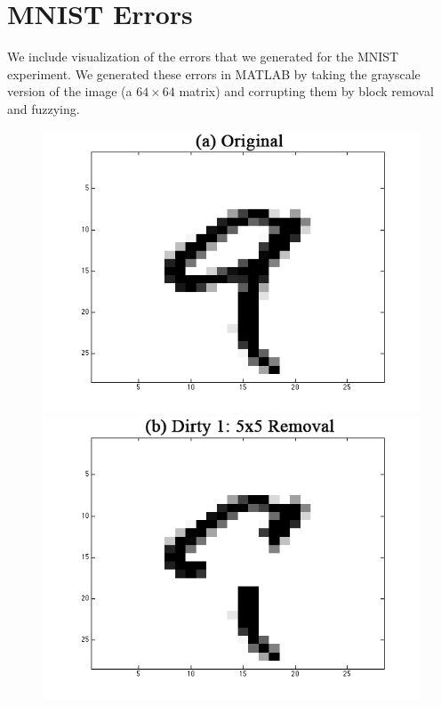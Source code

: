 \vspace{0.5em}

\section{MNIST Errors}
We include visualization of the errors that we generated for the MNIST experiment.
We generated these errors in MATLAB by taking the grayscale version of the image (a $64\times 64$ matrix) and corrupting them by block removal and fuzzying.

\begin{figure}[ht]
\centering
\includegraphics[scale=0.20]{exp/original.png}
 \includegraphics[scale=0.20]{exp/5x5removal.png}

\end{figure}
